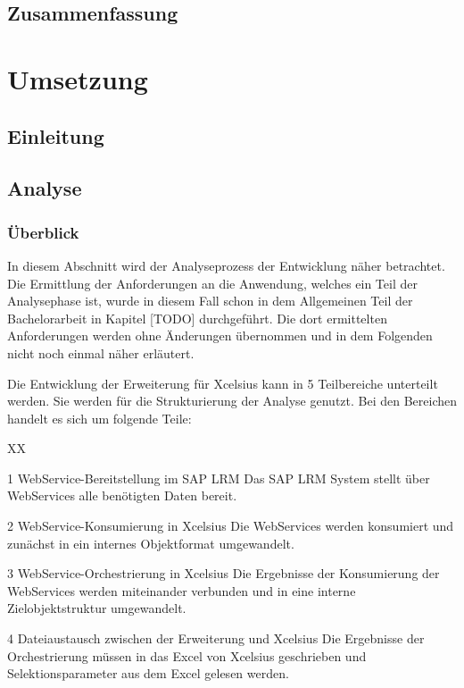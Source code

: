\section{Zusammenfassung}

\chapter{Umsetzung}
\section{Einleitung}
\section{Analyse}

\subsection{Überblick}

In diesem Abschnitt wird der Analyseprozess der Entwicklung näher betrachtet. Die Ermittlung der Anforderungen an die Anwendung, welches ein Teil der Analysephase ist, wurde in diesem Fall schon in dem Allgemeinen Teil der Bachelorarbeit in Kapitel [TODO] durchgeführt. Die dort ermittelten Anforderungen werden ohne Änderungen übernommen und in dem Folgenden nicht noch einmal näher erläutert.

Die Entwicklung der Erweiterung für Xcelsius kann in 5 Teilbereiche unterteilt werden. Sie werden für die Strukturierung der Analyse genutzt. Bei den Bereichen handelt es sich um folgende Teile:

\begin{seToplist} { XX }
\item[1] WebService-Bereitstellung im SAP LRM \newline
Das SAP LRM System stellt über WebServices alle benötigten Daten bereit.

\item[2] WebService-Konsumierung in Xcelsius \newline
Die WebServices werden konsumiert und zunächst in ein internes Objektformat umgewandelt.

\item[3] WebService-Orchestrierung in Xcelsius \newline
Die Ergebnisse der Konsumierung der WebServices werden miteinander verbunden und in eine interne Zielobjektstruktur umgewandelt.

\item[4] Dateiaustausch zwischen der Erweiterung und Xcelsius \newline
Die Ergebnisse der Orchestrierung müssen in das Excel von Xcelsius geschrieben und Selektionsparameter aus dem Excel gelesen werden.

\end{seToplist}

